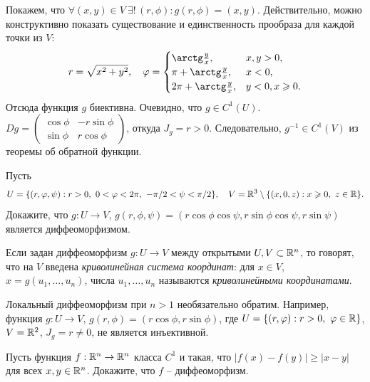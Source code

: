 \begin{myproof}
	Покажем, что $\forall (x, y) \in V \ \exists ! \, (r, \phi) : g(r, \phi) = (x, y)$. 
	Действительно, можно конструктивно показать существование и единственность прообраза для каждой точки из $V$:
	\[ r = \sqrt{x^2 + y^2}, \quad \phi = \begin{cases}
	 \arctg \frac{y}{x}, & x, y > 0, \\  
	 \pi + \arctg \frac{y}{x}, & x < 0, \\ 
	 2\pi + \arctg \frac{y}{x}, & y < 0, x \geq 0.
	\end{cases} \]
	Отсюда функция $g$ биективна. Очевидно, что $g \in C^1(U)$. $Dg = \begin{pmatrix}
		\cos \phi & - r \sin \phi \\ 
		\sin \phi & r \cos \phi
	\end{pmatrix}$, откуда $J_g = r > 0$.
	Следовательно, $g^{-1} \in C^1(V)$ из теоремы об обратной функции.
\end{myproof}

\begin{problem}
	Пусть 
	\[ U = \{(r, \varphi, \psi) : r > 0, \ 0 < \varphi < 2\pi, \ -\pi/2 < \psi < \pi/2\}, \quad V = \mathbb{R}^3 \setminus \{(x, 0, z) : x \geqslant 0, \ z \in \mathbb{R}\}. \]
	Докажите, что $g : U \to V$, $g(r, \phi, \psi) = (r \cos \phi \cos \psi, r \sin \phi \cos \psi, r \sin \psi)$ является диффеоморфизмом.
\end{problem}

\begin{definition}
	Если задан диффеоморфизм $g : U \to V$ между открытыми $U, V \subset \mathbb{R}^n$, то говорят, что на $V$ введена \textit{криволинейная система координат}:
	для $x \in V$, $x = g(u_1, \dotsc, u_n)$, числа $u_1, \dotsc, u_n$ называются \textit{криволинейными координатами}.
\end{definition}

\begin{note}
	Локальный диффеоморфизм при $n > 1$ необязательно обратим.
	Например, функция $g : U \to V$, $g(r, \phi) = (r \cos \phi, r \sin \phi)$, где $U = \{(r, \varphi) : r > 0, \ \varphi \in \mathbb{R}\}$, $V = \mathbb{R}^2$, $J_g = r \neq 0$, не является инъективной.
\end{note}

\begin{problem}
	Пусть функция $f : \mathbb{R}^n \to \mathbb{R}^n$ класса $C^1$ и такая, что $|f(x) - f(y)| \geq |x - y|$ для всех $x, y \in \mathbb{R}^n$. 
	Докажите, что $f$ -- диффеоморфизм.
\end{problem}



